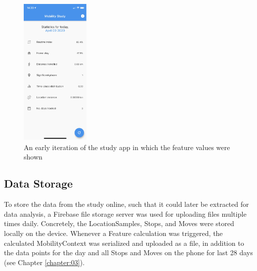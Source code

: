 \begin{figure}
    \centering
    \includegraphics[width=0.3\textwidth]{images/app_imgs/screens-features.pdf}
    \caption{An early iteration of the study app in which the feature values were shown}
    \label{fig:app-features-screen}
\end{figure}

\subsection{Data Storage}
To store the data from the study online, such that it could later be extracted for data analysis, a Firebase file storage server was used for uploading files multiple times daily. Concretely, the LocationSamples, Stops, and Moves were stored locally on the device. Whenever a Feature calculation was triggered, the calculated MobilityContext was serialized and uploaded as a file, in addition to the data points for the day and all Stops and Moves on the phone for last 28 days (see Chapter \ref{chapter:03}).